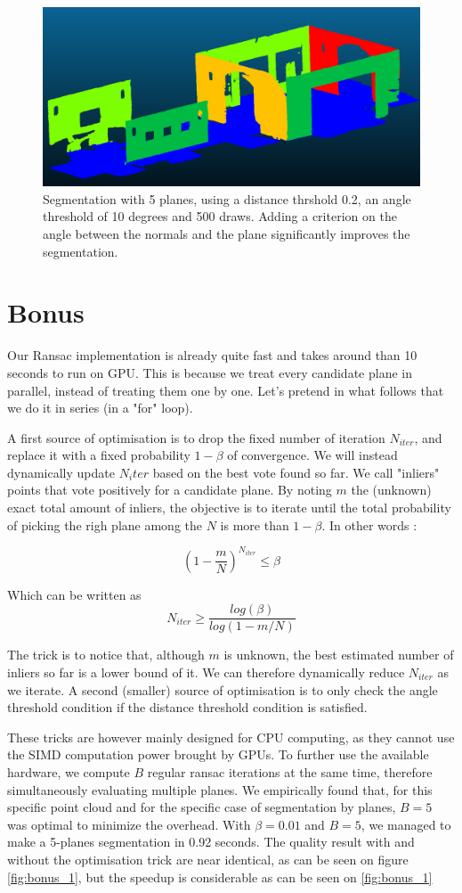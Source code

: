 \documentclass[a4paper]{article}
\begin{document}
\begin{figure}[ht]
    \centering
    \includegraphics[width=0.3\linewidth]{figures/Q4.png}
    \caption{Segmentation with 5 planes, using a distance thrshold 0.2, an angle threshold of 10 degrees and 500 draws.
    Adding a criterion on the angle between the normals and the plane significantly improves the segmentation.}
    \label{fig:Q4}
\end{figure}

\section*{Bonus}
Our Ransac implementation is already quite fast and takes around than 10 seconds to run on GPU.
This is because we treat every candidate plane in parallel, instead of treating them one by one. Let's pretend in what follows that we do it in series (in a "for" loop).

A first source of optimisation is to drop the fixed number of iteration $N_{iter}$, and replace it with a fixed probability $1 - \beta$ of convergence.
We will instead dynamically update $N_iter$ based on the best vote found so far.
We call "inliers" points that vote positively for a candidate plane. By noting $m$ the (unknown) exact total amount of inliers,
the objective is to iterate until the total probability of picking the righ plane among the $N$ is more than $1 - \beta$. In other words :

$$
(1 - \frac{m}{N})^{N_{iter}} \leq \beta
$$

Which can be written as 
$$
N_{iter} \geq \frac{log(\beta)} {log(1-m/N)}
$$


The trick is to notice that, although $m$ is unknown, the best estimated number of inliers so far is a lower bound of it. We can therefore dynamically reduce $N_{iter}$ as we iterate.
A second (smaller) source of optimisation is to only check the angle threshold condition if the distance threshold condition is satisfied.

These tricks are however mainly designed for CPU computing, as they cannot use the SIMD computation power brought by GPUs. To further use the available hardware, we compute $B$ regular ransac iterations at the same time, therefore simultaneously evaluating multiple planes.
We empirically found that, for this specific point cloud and for the specific case of segmentation by planes, $B=5$ was optimal to minimize the overhead.
With $\beta = 0.01$ and $B=5$, we managed to make a 5-planes segmentation in 0.92 seconds. The quality result with and without the optimisation trick are near identical, as can be seen on figure \ref{fig:bonus_1}, but the speedup is considerable as can be seen on  \ref{fig:bonus_1}
\end{document}
